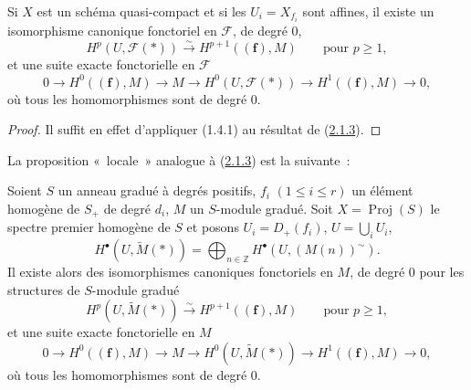 \begin{corollary}[2.1.4]
\label{III.2.1.4-fr}
Si $X$ est un schéma quasi-compact et si les $U_i=X_{f_i}$ sont affines,
il existe un isomorphisme canonique fonctoriel en $\mathcal F$, de degré $0$,
\begin{equation}
\label{III.2.1.4.1-fr}
\tag{2.1.4.1}
H^p(U,\mathcal F(*))\xrightarrow{\sim}H^{p+1}((\mathbf f),M)
\qquad\text{pour }p\geq1,
\end{equation}
et une suite exacte fonctorielle en $\mathcal F$
\begin{equation}
\label{III.2.1.4.2-fr}
\tag{2.1.4.2}
0\longrightarrow H^0((\mathbf f),M)\longrightarrow M
\longrightarrow H^0(U,\mathcal F(*))
\longrightarrow H^1((\mathbf f),M)\longrightarrow0,
\end{equation}
où tous les homomorphismes sont de degré $0$.
\end{corollary}

\begin{proof}
Il suffit en effet d'appliquer (1.4.1) au résultat de
(\hyperref[III.2.1.3-fr]{2.1.3}).
\end{proof}

La proposition «~locale~» analogue à
(\hyperref[III.2.1.3-fr]{2.1.3}) est la suivante~:

\begin{proposition}[2.1.5]
\label{III.2.1.5-fr}
Soient $S$ un anneau gradué à degrés positifs,
$f_i$ $(1\leq i\leq r)$ un élément homogène de $S_+$ de degré $d_i$,
$M$ un $S$-module gradué. Soit $X=\operatorname{Proj}(S)$ le spectre
premier homogène de $S$ et posons $U_i=D_+(f_i)$,
$U=\bigcup_iU_i$,
\[
H^\bullet(U,\widetilde M(*))
=\bigoplus_{n\in\mathbb Z}H^\bullet(U,(M(n))^\sim).
\]
Il existe alors des isomorphismes canoniques fonctoriels en $M$, de degré
$0$ pour les structures de $S$-module gradué
\begin{equation}
\label{III.2.1.5.1-fr}
\tag{2.1.5.1}
H^p(U,\widetilde M(*))\xrightarrow{\sim}H^{p+1}((\mathbf f),M)
\qquad\text{pour }p\geq1,
\end{equation}
et une suite exacte fonctorielle en $M$
\begin{equation}
\label{III.2.1.5.2-fr}
\tag{2.1.5.2}
0\longrightarrow H^0((\mathbf f),M)\longrightarrow M
\longrightarrow H^0(U,\widetilde M(*))
\longrightarrow H^1((\mathbf f),M)\longrightarrow0,
\end{equation}
où tous les homomorphismes sont de degré $0$.
\end{proposition}

